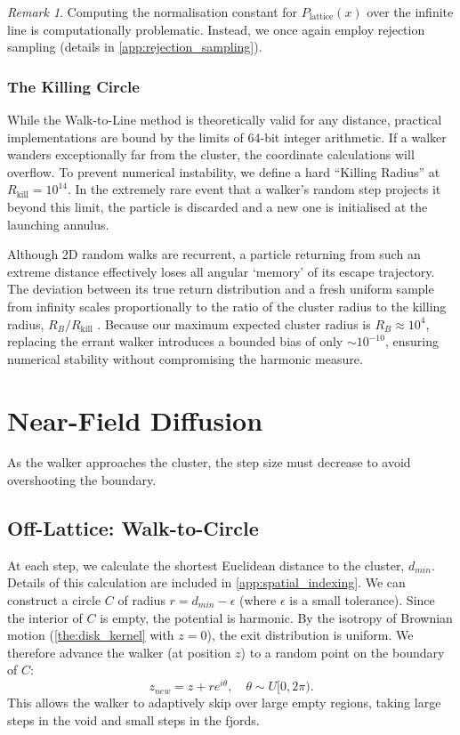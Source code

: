 \documentclass[12pt, a4paper, oneside]{report}
\theoremstyle{remark}
\newtheorem{remark}[theorem]{Remark}
\begin{document}
\begin{remark}
Computing the normalisation constant for $P_{\text{lattice}}(x)$ over the infinite line is computationally problematic. Instead, we once again employ rejection sampling (details in \cref{app:rejection_sampling}).
\end{remark}

\subsubsection{The Killing Circle}
While the Walk-to-Line method is theoretically valid for any distance, practical implementations are bound by the limits of 64-bit integer arithmetic. If a walker wanders exceptionally far from the cluster, the coordinate calculations will overflow. To prevent numerical instability, we define a hard ``Killing Radius'' at $R_{\text{kill}} = 10^{14}$. In the extremely rare event that a walker's random step projects it beyond this limit, the particle is discarded and a new one is initialised at the launching annulus.

Although 2D random walks are recurrent, a particle returning from such an extreme distance effectively loses all angular `memory' of its escape trajectory. The deviation between its true return distribution and a fresh uniform sample from infinity scales proportionally to the ratio of the cluster radius to the killing radius, $R_B / R_{\text{kill}}$ \cite{Loh2014}. Because our maximum expected cluster radius is $R_B \approx 10^4$, replacing the errant walker introduces a bounded bias of only $\sim 10^{-10}$, ensuring numerical stability without compromising the harmonic measure.
\section{Near-Field Diffusion}
\label{sec:near_field}
As the walker approaches the cluster, the step size must decrease to avoid overshooting the boundary. 

\subsection{Off-Lattice: Walk-to-Circle}
At each step, we calculate the shortest Euclidean distance to the cluster, $d_{min}$. Details of this calculation are included in \cref{app:spatial_indexing}. We can construct a circle $C$ of radius $r = d_{min} - \epsilon$ (where $\epsilon$ is a small tolerance). Since the interior of $C$ is empty, the potential is harmonic.
By the isotropy of Brownian motion (\cref{the:disk_kernel} with $z=0$), the exit distribution is uniform. We therefore advance the walker (at position $z$) to a random point on the boundary of $C$:
\begin{equation*}
    z_{new} = z + r e^{i\theta}, \quad \theta \sim U[0, 2\pi).
\end{equation*}
This allows the walker to adaptively skip over large empty regions, taking large steps in the void and small steps in the fjords.
\end{document}
